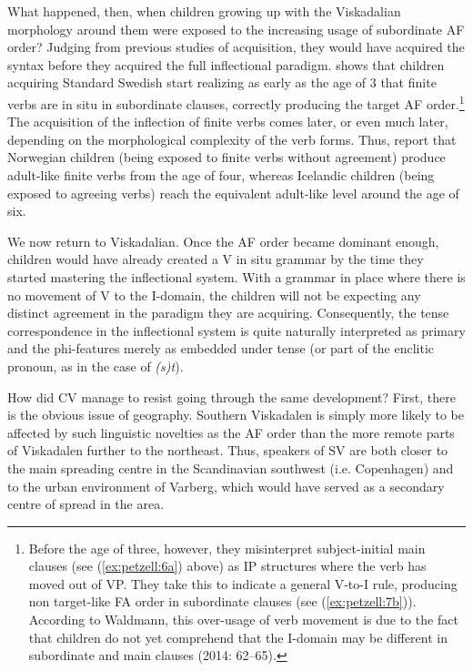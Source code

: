 \documentclass[output=paper,colorlinks,citecolor=brown,draft,draftmode]{langscibook}
\begin{document}
What happened, then, when children growing up with the Viskadalian morphology around them were exposed to the increasing usage of subordinate AF order? Judging from previous studies of acquisition, they would have acquired the syntax before they acquired the full inflectional paradigm. \citet{Waldmann2014} shows that children acquiring Standard Swedish start realizing as early as the age of 3 that finite verbs are in situ in subordinate clauses, correctly producing the target AF order.\footnote{Before the age of three, however, they misinterpret subject-initial main clauses (see (\ref{ex:petzell:6a}) above) as IP structures where the verb has moved out of VP. They take this to indicate a general V-to-I rule, producing non target-like FA order in subordinate clauses (see (\ref{ex:petzell:7b})). According to Waldmann, this over-usage of verb movement is due to the fact that children do not yet comprehend that the I-domain may be different in subordinate and main clauses (2014: 62–65).} The acquisition of the inflection of finite verbs comes later, or even much later, depending on the morphological complexity of the verb forms. Thus, \citet{RagnarsdottirEtAl1999} report that Norwegian children (being exposed to finite verbs without agreement) produce adult-like finite verbs from the age of four, whereas Icelandic children (being exposed to agreeing verbs) reach the equivalent adult-like level around the age of six.



We now return to Viskadalian. Once the AF order became dominant enough, children would have already created a V in situ grammar by the time they started mastering the inflectional system. With a grammar in place where there is no movement of V to the I-domain, the children will not be expecting any distinct agreement in the paradigm they are acquiring. Consequently, the tense correspondence in the inflectional system is quite naturally interpreted as primary and the phi-features merely as embedded under tense (or part of the enclitic pronoun, as in the case of \textit{(s)t}).



How did CV manage to resist going through the same development? First, there is the obvious issue of geography. Southern Viskadalen is simply more likely to be affected by such linguistic novelties as the AF order than the more remote parts of Viskadalen further to the northeast. Thus, speakers of SV are both closer to the main spreading centre in the Scandinavian southwest (i.e. Copenhagen) and to the urban environment of Varberg, which would have served as a secondary centre of spread in the area. 
\end{document}
